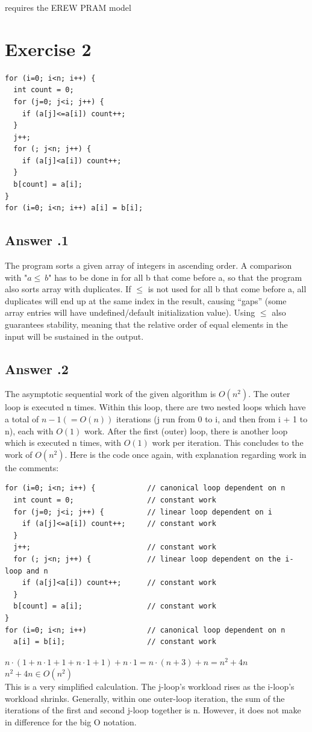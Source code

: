 \documentclass[a4paper,%
11pt,%
DIV=12,
headsepline,%
headings=normal,
]{scrartcl}
\newcounter{curex}
\newcommand{\exercise}[1]{\section*{Exercise #1}\setcounter{curex}{#1}}
\newcommand{\answer}[1]{\subsection*{Answer \arabic{curex}.#1}}
\begin{document}
requires the EREW PRAM model

\exercise{2}

\begin{minipage}[t]{1.0\linewidth}
\begin{lstlisting}
for (i=0; i<n; i++) {
  int count = 0;
  for (j=0; j<i; j++) {
    if (a[j]<=a[i]) count++;
  }
  j++;
  for (; j<n; j++) {
    if (a[j]<a[i]) count++;
  }
  b[count] = a[i];
}
for (i=0; i<n; i++) a[i] = b[i];
\end{lstlisting}
\end{minipage}

\answer{1}
The program sorts a given array of integers in ascending order. A comparison with "$a \leq \ b$" has to be done in for all b that come before a, so that the program also sorts array with duplicates. If $\leq$ is not used for all b that come before a, all duplicates will end up at the same index in the result, causing ``gaps'' (some array entries will have undefined/default initialization value). Using $\leq$ also guarantees stability, meaning that the relative order of equal elements in the input will be sustained in the output.

\answer{2}
The asymptotic sequential work of the given algorithm is $O(n^{2})$. The outer loop is executed n times. Within this loop, there are two nested loops which have a total of $n-1 (= O(n))$ iterations (j run from 0 to i, and then from i + 1 to n), each with $O(1)$ work. After the first (outer) loop, there is another loop which is executed n times, with $O(1)$ work per iteration. This concludes to the work of $O(n^{2})$. Here is the code once again, with explanation regarding work in the comments:

\begin{minipage}[t]{1.0\linewidth}
\begin{lstlisting}
for (i=0; i<n; i++) {            // canonical loop dependent on n
  int count = 0;                 // constant work
  for (j=0; j<i; j++) {          // linear loop dependent on i
    if (a[j]<=a[i]) count++;     // constant work
  }
  j++;                           // constant work
  for (; j<n; j++) {             // linear loop dependent on the i-loop and n
    if (a[j]<a[i]) count++;      // constant work
  }
  b[count] = a[i];               // constant work
}
for (i=0; i<n; i++)              // canonical loop dependent on n
  a[i] = b[i];                   // constant work
\end{lstlisting}
\end{minipage}
\noindent
\begin{math}n \cdot (1 + n \cdot 1 + 1 + n \cdot 1 + 1) + n \cdot 1 = n \cdot (n + 3) + n = n^2 + 4n\end{math}\\
\begin{math}n^2 + 4n \in O(n^2)\end{math}\\
This is a very simplified calculation. The j-loop's workload rises as the i-loop's workload shrinks. Generally, within one outer-loop iteration, the sum of the iterations of the first and second j-loop together is n. However, it does not make in difference for the big O notation.
\end{document}
